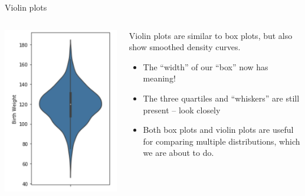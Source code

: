 \documentclass[aspectratio=169]{../latex_main/tntbeamer}  %
\begin{document}
	
	\begin{frame}[c]{Violin plots}
	     \begin{columns}
            \begin{column}{.5\textwidth}

                        \centering
                       \includegraphics[scale=.55]{Bild41}

            \end{column}
            
            
            \begin{column}{.5\textwidth}

                Violin plots are similar to box plots, but also show smoothed density curves.
                \begin{itemize}
                    \item The “width” of our “box” now has meaning!
                    \item The three quartiles and “whiskers” are still present – look closely
                    \item Both box plots and violin plots are useful for comparing multiple distributions, which we are about to do.
                \end{itemize}
                
            \end{column}
        \end{columns}
	\end{frame}
\end{document}
